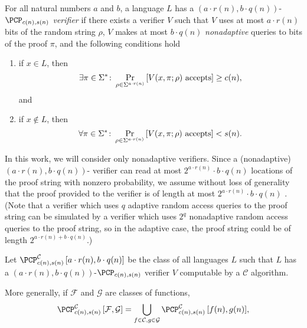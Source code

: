 \documentclass[]{article}
\newcommand{\PCPcs}[5]{\PCP^{#1}_{#2, #3}\left[#4, #5\right]}
\begin{document}
\begin{definition}
  For all natural numbers $a$ and $b$, a language $L$ has a $(a \cdot r(n), b \cdot q(n))$-\emph{$\PCP_{c(n), s(n)}$ verifier} if there exists a \PCP{} verifier $V$ such that $V$ uses at most $a \cdot r(n)$ bits of the random string $\rho$, $V$ makes at most $b \cdot q(n)$ \emph{nonadaptive} queries to bits of the proof $\pi$, and the following conditions hold
  \begin{enumerate}
  \item if $x \in L$, then
    \begin{equation*}
      \exists \pi \in \Sigma^* \colon \Pr_{\rho \in \Sigma^{a \cdot r(n)}}{\left[V(x, \pi; \rho) \textnormal{ accepts}\right]} \geq c(n),
    \end{equation*}
    and
  \item if $x \notin L$, then
    \begin{equation*}
      \forall \pi \in \Sigma^* \colon \Pr_{\rho \in \Sigma^{a \cdot r(n)}}{\left[V(x, \pi; \rho) \textnormal{ accepts}\right]} < s(n).
    \end{equation*}
  \end{enumerate}
\end{definition}

In this work, we will consider only nonadaptive \PCP{} verifiers.
Since a (nonadaptive) $(a \cdot r(n), b \cdot q(n))$-\PCP{} verifier can read at most $2^{a \cdot r(n)} \cdot b \cdot q(n)$ locations of the proof string with nonzero probability, we assume without loss of generality that the proof provided to the verifier is of length at most $2^{a \cdot r(n)} \cdot b \cdot q(n)$ \cite[Remark~11.6]{ab09}.
(Note that a verifier which uses $q$ adaptive random access queries to the proof string can be simulated by a verifier which uses $2^q$ nonadaptive random access queries to the proof string, so in the adaptive case, the proof string could be of length $2^{a \cdot r(n) + b \cdot q(n)}$.)

\begin{definition}
  Let $\PCPcs{\mathcal{C}}{c(n)}{s(n)}{a \cdot r(n)}{b \cdot q(n)}$ be the class of all languages $L$ such that $L$ has a $(a \cdot r(n), b \cdot q(n))$-$\PCP_{c(n), s(n)}$ verifier $V$ computable by a $\mathcal{C}$ algorithm.

  More generally, if $\mathcal{F}$ and $\mathcal{G}$ are classes of functions,
  \begin{equation*}
    \PCPcs{\mathcal{C}}{c(n)}{s(n)}{\mathcal{F}}{\mathcal{G}} = \bigcup_{f \in \mathcal{C}, g \in \mathcal{G}}{\PCPcs{\mathcal{C}}{c(n)}{s(n)}{f(n)}{g(n)}},
    \end{equation*}
\end{definition}
\end{document}
